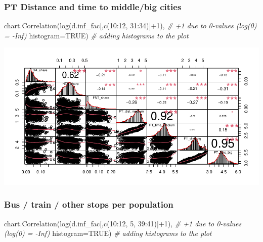 \documentclass[
]{article}
\newenvironment{Shaded}{\begin{snugshade}}{\end{snugshade}}
\newcommand{\AttributeTok}[1]{\textcolor[rgb]{0.77,0.63,0.00}{#1}}
\newcommand{\CommentTok}[1]{\textcolor[rgb]{0.56,0.35,0.01}{\textit{#1}}}
\newcommand{\ConstantTok}[1]{\textcolor[rgb]{0.00,0.00,0.00}{#1}}
\newcommand{\DecValTok}[1]{\textcolor[rgb]{0.00,0.00,0.81}{#1}}
\newcommand{\FunctionTok}[1]{\textcolor[rgb]{0.00,0.00,0.00}{#1}}
\newcommand{\NormalTok}[1]{#1}
\newcommand{\SpecialCharTok}[1]{\textcolor[rgb]{0.00,0.00,0.00}{#1}}
\begin{document}
\hypertarget{pt-distance-and-time-to-middlebig-cities}{%
\subsubsection{PT Distance and time to middle/big
cities}\label{pt-distance-and-time-to-middlebig-cities}}

\begin{Shaded}
\begin{Highlighting}[]
\FunctionTok{chart.Correlation}\NormalTok{(}\FunctionTok{log}\NormalTok{(d.inf\_fac[,}\FunctionTok{c}\NormalTok{(}\DecValTok{10}\SpecialCharTok{:}\DecValTok{12}\NormalTok{, }\DecValTok{31}\SpecialCharTok{:}\DecValTok{34}\NormalTok{)]}\SpecialCharTok{+}\DecValTok{1}\NormalTok{), }\CommentTok{\# +1 due to 0{-}values (log(0) = {-}Inf)}
                  \AttributeTok{histogram=}\ConstantTok{TRUE}\NormalTok{) }\CommentTok{\# adding histograms to the plot}
\end{Highlighting}
\end{Shaded}

\includegraphics{Lin_Mod_Clus_Anal_files/figure-latex/unnamed-chunk-11-1.pdf}

\hypertarget{bus-train-other-stops-per-population}{%
\subsubsection{Bus / train / other stops per
population}\label{bus-train-other-stops-per-population}}

\begin{Shaded}
\begin{Highlighting}[]
\FunctionTok{chart.Correlation}\NormalTok{(}\FunctionTok{log}\NormalTok{(d.inf\_fac[,}\FunctionTok{c}\NormalTok{(}\DecValTok{10}\SpecialCharTok{:}\DecValTok{12}\NormalTok{, }\DecValTok{5}\NormalTok{, }\DecValTok{39}\SpecialCharTok{:}\DecValTok{41}\NormalTok{)]}\SpecialCharTok{+}\DecValTok{1}\NormalTok{), }\CommentTok{\# +1 due to 0{-}values (log(0) = {-}Inf)}
                  \AttributeTok{histogram=}\ConstantTok{TRUE}\NormalTok{) }\CommentTok{\# adding histograms to the plot}
\end{Highlighting}
\end{Shaded}
\end{document}
